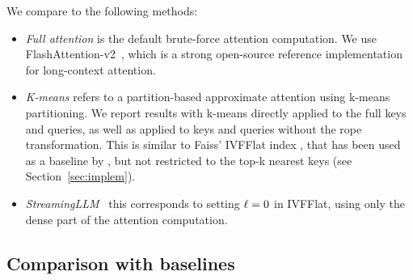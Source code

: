 We compare \OURS to the following methods:  
\ificml \\[-2.3em] \fi

\begin{itemize}
\item 
\textit{Full attention} is the default brute-force attention computation. 
We use FlashAttention-v2~\citep{daoflashattention}, which is a strong open-source reference implementation for long-context attention.  \\[-1.8em]
%
\item 
\textit{K-means} refers to a partition-based approximate attention using k-means partitioning.
We report results with k-means directly applied to the full keys and queries, as well as applied to keys and queries without the rope transformation.
%
%
This is similar to Faiss' IVFFlat index \citep{douze2024faiss}, that has been used as a baseline by \cite{liu2024retrievalattention}, but not restricted to the top-k nearest keys (see Section~\ref{sec:implem}). \\[-1.8em]
\item 
\textit{StreamingLLM}~\cite{xiao2024efficientstreaminglanguagemodels} this corresponds to setting $\ell=0$ in IVFFlat, using only the dense part of the attention computation. 
\ificml \\[-1.8em] \fi
\end{itemize}


%


\subsection{Comparison with baselines}
\label{sec:baselines}

